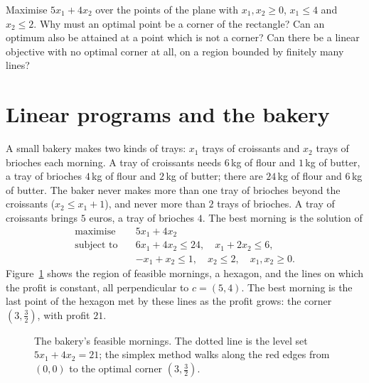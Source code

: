 \begin{think}
Maximise $5x_1+4x_2$ over the points of the plane with $x_1,x_2\ge0$, $x_1\le4$ and $x_2\le2$. Why must an optimal point be a corner of the rectangle? Can an optimum also be
attained at a point which is not a corner? Can there be a linear objective with no optimal corner at all, on a region bounded by finitely many lines?
\end{think}

\section{Linear programs and the bakery}\label{sec:lpintro}

A small bakery makes two kinds of trays: $x_1$ trays of croissants and $x_2$ trays of brioches each morning. A tray of croissants needs $6$\,kg of flour and $1$\,kg of butter, a tray of
brioches $4$\,kg of flour and $2$\,kg of butter; there are $24$\,kg of flour and $6$\,kg of butter. The baker never makes more than one tray of brioches beyond the croissants
($x_2\le x_1+1$), and never more than $2$ trays of brioches. A tray of croissants brings $5$ euros, a tray of brioches $4$. The best morning is the solution of
\begin{equation}\label{eq:bakery}
\begin{aligned}
\text{maximise}\quad & 5x_1+4x_2\\
\text{subject to}\quad & 6x_1+4x_2\le24,\quad x_1+2x_2\le6,\\
& -x_1+x_2\le1,\quad x_2\le2,\quad x_1,x_2\ge0.
\end{aligned}
\end{equation}
Figure~\ref{fig:bakery} shows the region of feasible mornings, a hexagon, and the lines on which the profit is constant, all perpendicular to $c=(5,4)$. The best morning is the
last point of the hexagon met by these lines as the profit grows: the corner $(3,\tfrac32)$, with profit $21$.

\begin{figure}[ht]
\centering
{}
\caption{The bakery's feasible mornings. The dotted line is the level set $5x_1+4x_2=21$; the simplex method walks along the red edges from $(0,0)$ to the optimal corner $(3,\tfrac32)$.}
\label{fig:bakery}
\end{figure}

